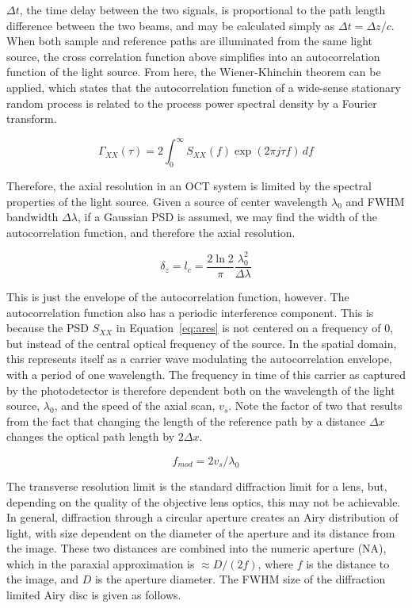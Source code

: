 $\Delta t$, the time delay between the two signals, is proportional to the path length difference between the two beams, and may be calculated simply as $\Delta t = \Delta z / c$. When both sample and reference paths are illuminated from the same light source, the cross correlation function above simplifies into an autocorrelation function of the light source. From here, the Wiener-Khinchin theorem can be applied, which states that the autocorrelation function of a wide-sense stationary random process is related to the process power spectral density by a Fourier transform.

\begin{equation}
\Gamma_{XX}(\tau) = 2 \int_{0}^\infty S_{XX}(f) \exp(2 \pi j \tau f) \,df
\end{equation}

Therefore, the axial resolution in an OCT system is limited by the spectral properties of the light source. Given a source of center wavelength $\lambda_0$ and FWHM bandwidth $\Delta \lambda$, if a Gaussian PSD is assumed, we may find the width of the autocorrelation function, and therefore the axial resolution. \cite{fercher}

\begin{equation} \label{eq:ares}
\delta_z = l_c = \frac{2 \ln{2}}{\pi} \frac{\lambda_0^2}{\Delta \lambda}
\end{equation}

This is just the envelope of the autocorrelation function, however. The autocorrelation function also has a periodic interference component. This is because the PSD $S_{XX}$ in Equation~\ref{eq:ares} is not centered on a frequency of 0, but instead of the central optical frequency of the source. In the spatial domain, this represents itself as a carrier wave modulating the autocorrelation envelope, with a period of one wavelength. The frequency in time of this carrier as captured by the photodetector is therefore dependent both on the wavelength of the light source, $\lambda_0$, and the speed of the axial scan, $v_s$. Note the factor of two that results from the fact that changing the length of the reference path by a distance $\Delta x$ changes the optical path length by $ 2 \Delta x$. \cite{fercher}

\begin{equation} \label{eq:carrier}
f_{mod} = 2 v_s / \lambda_0
\end{equation}

The transverse resolution limit is the standard diffraction limit for a lens, but, depending on the quality of the objective lens optics, this may not be achievable. In general, diffraction through a circular aperture creates an Airy distribution of light, with size dependent on the diameter of the aperture and its distance from the image. These two distances are combined into the numeric aperture (NA), which in the paraxial approximation is $\approx D/(2f)$, where $f$ is the distance to the image, and $D$ is the aperture diameter. The FWHM size of the diffraction limited Airy disc is given as follows. \cite{hecht}

